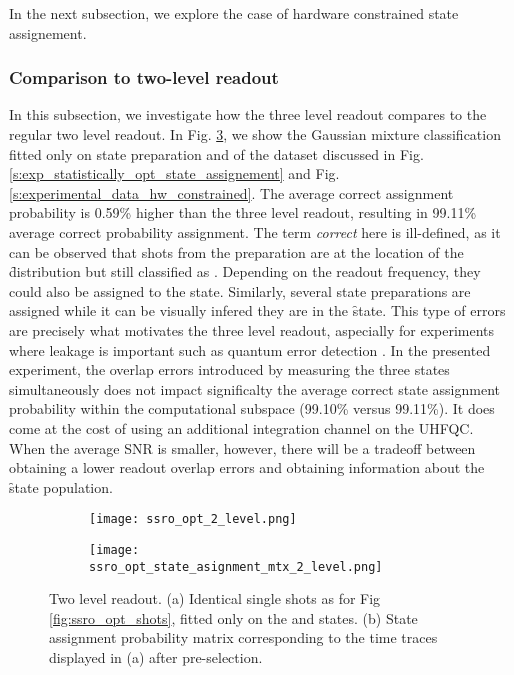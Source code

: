 In the next subsection, we explore the case of hardware constrained state assignement.


\subsubsection{Comparison to two-level readout} \label{s:comparison_2_lv_ro}
In this subsection, we investigate how the three level readout compares to the regular two level readout. In Fig.  \ref{fig:ssro_opt_2lv}, we show the Gaussian mixture classification fitted only on state preparation \g and \e of the dataset discussed in Fig. \ref{s:exp_statistically_opt_state_assignement} and Fig.  \ref{s:experimental_data_hw_constrained}. The average correct assignment probability is 0.59\% higher than the three level readout, resulting in 99.11\% average correct probability assignment. The term \textit{correct} here is ill-defined, as it can be observed that shots from the \g preparation are at the location of the \f distribution but still classified as \g. Depending on the readout frequency, they could also be assigned to the \e state. Similarly, several \e state preparations are assigned \g while it can be visually infered they are in the \f state. This type of errors are precisely what motivates the three level readout, aspecially for experiments where leakage is important such as quantum error detection \cite{Ghosh2013UnderstandingCircuits}. In the presented experiment, the overlap errors introduced by measuring the three states simultaneously does not impact significalty the average correct state assignment probability within the computational subspace (99.10\% versus 99.11\%). It does come at the cost of using an additional integration channel on the UHFQC. When the average SNR is smaller, however, there will be a tradeoff between obtaining a lower readout overlap errors and obtaining information about the \f state population. 
\begin{figure}[H]
  \centering
  \begin{subfigure}[t]{0.57\textwidth}
     \centering 
     \texttt{[image: ssro\_opt\_2\_level.png]}
     \caption{ }
     \label{fig:ssro_opt_shots_2lv}
  \end{subfigure}
  \hspace{5pt}
  \begin{subfigure}[t]{0.38\textwidth}
     \centering 
     \texttt{[image: ssro\_opt\_state\_asignment\_mtx\_2\_level.png]}
     \caption{ }
     \label{fig:ssro_opt_state_asignment_mtx_2lv}
  \end{subfigure}
   \caption{Two level readout. (a) Identical single shots as for Fig \ref{fig:ssro_opt_shots}, fitted only on the \g and \e states. (b) State assignment probability matrix corresponding to the time traces displayed in (a) after pre-selection. }
  \label{fig:ssro_opt_2lv}
\end{figure}

